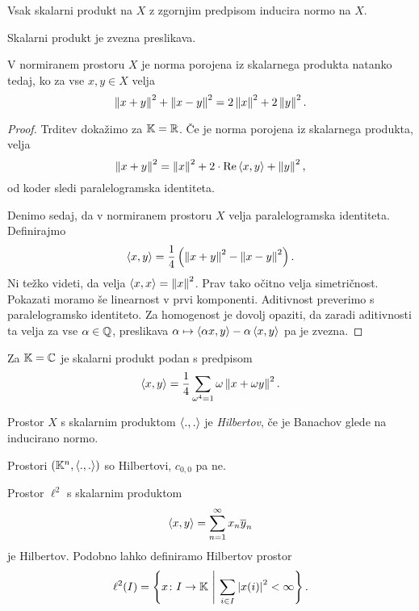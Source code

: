 \begin{posledica}
Vsak skalarni produkt na $X$ z zgornjim predpisom inducira normo na
$X$.
\end{posledica}

\begin{opomba}
Skalarni produkt je zvezna preslikava.
\end{opomba}

\begin{izrek}
V normiranem prostoru $X$ je norma porojena iz skalarnega produkta
natanko tedaj, ko za vse $x, y \in X$ velja
\[
\left\lVert x+y\right\rVert^2 + \left\lVert x-y\right\rVert^2 = 2 \left\lVert x\right\rVert^2 + 2 \left\lVert y\right\rVert^2.
\]
\end{izrek}

\begin{proof}
Trditev dokažimo za $\mathbb{K} = \mathbb{R}$. Če je norma porojena iz skalarnega
produkta, velja
\[
\left\lVert x+y\right\rVert^2 = \left\lVert x\right\rVert^2 + 2 \cdot \operatorname{Re} \left\langle x,y\right\rangle + \left\lVert y\right\rVert^2,
\]
od koder sledi paralelogramska identiteta.

Denimo sedaj, da v normiranem prostoru $X$ velja paralelogramska
identiteta. Definirajmo
\[
\left\langle x,y\right\rangle = \frac{1}{4} \left(\left\lVert x+y\right\rVert^2 - \left\lVert x-y\right\rVert^2\right).
\]
Ni težko videti, da velja $\left\langle x,x\right\rangle = \left\lVert x\right\rVert^2$. Prav tako
očitno velja simetričnost. Pokazati moramo še linearnost v prvi
komponenti. Aditivnost preverimo s paralelogramsko identiteto. Za
homogenost je dovolj opaziti, da zaradi aditivnosti ta velja za vse
$\alpha \in \mathbb{Q}$, preslikava
$\alpha \mapsto \left\langle \alpha x,y\right\rangle - \alpha \left\langle x,y\right\rangle$ pa je zvezna.
\end{proof}

\begin{opomba}
Za $\mathbb{K} = \mathbb{C}$ je skalarni produkt podan s predpisom
\[
\left\langle x,y\right\rangle =
\frac{1}{4} \sum_{\omega^4 = 1} \omega \left\lVert x + \omega y\right\rVert^2.
\]
\end{opomba}


\begin{definicija}
Prostor $X$ s skalarnim produktom $\left\langle .,.\right\rangle$ je
\emph{Hilbertov}, če je Banachov
glede na inducirano normo.
\end{definicija}

\begin{zgled}
Prostori $(\mathbb{K}^n, \left\langle .,.\right\rangle)$ so Hilbertovi, $c_{0,0}$ pa ne.
\end{zgled}

\begin{zgled}
Prostor $\ell^2$ s skalarnim produktom
\[
\left\langle x,y\right\rangle = \sum_{n=1}^\infty x_n \overline{y}_n
\]
je Hilbertov. Podobno lahko definiramo Hilbertov prostor
\[
\ell^2(I) =
\left\{x \colon I \to \mathbb{K}~\middle\vert~\sum_{i \in I} \left\lvert x(i)\right\rvert^2 < \infty\right\}.
\]
\end{zgled}

